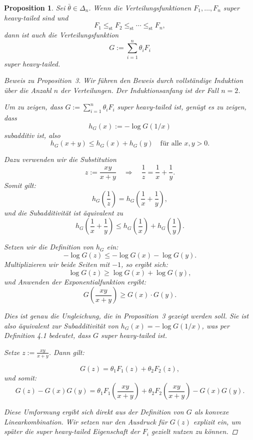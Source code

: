 \documentclass[
12pt,
fancyheadings, %
%
a4paper, 
%
]{tuhhreprt}
\newtheorem{proposition}[definition]{Proposition}
\begin{document}
    \begin{proposition}
Sei \( \bar{\theta} \in \Delta_n \). Wenn die Verteilungsfunktionen \( F_1, \dots, F_n \) super heavy-tailed sind und
\[
F_1 \leq_{\mathrm{st}} F_2 \leq_{\mathrm{st}} \cdots \leq_{\mathrm{st}} F_n,
\]
dann ist auch die Verteilungsfunktion
\[
G := \sum_{i=1}^n \theta_i F_i
\]
super heavy-tailed.  \cite[Proposition 3.]{ChenShneer2024}

\begin{proof}[Beweis zu Proposition~3]
Wir führen den Beweis durch vollständige Induktion über die Anzahl \( n \) der Verteilungen. Der Induktionsanfang ist der Fall \( n = 2 \).

Um zu zeigen, dass \( G := \sum_{i=1}^n \theta_i F_i \) super heavy-tailed ist, genügt es zu zeigen, dass
\[
h_G(x) := -\log G(1/x)
\]
subadditiv ist, also
\[
h_G(x + y) \leq h_G(x) + h_G(y) \quad \text{für alle } x, y > 0.
\]


\medskip

Dazu verwenden wir die Substitution
\[
z := \frac{xy}{x + y} \quad \Rightarrow \quad \frac{1}{z} = \frac{1}{x} + \frac{1}{y}.
\]
Somit gilt:
\[
h_G\left( \frac{1}{z} \right) = h_G\left( \frac{1}{x} + \frac{1}{y} \right),
\]
und die Subadditivität ist äquivalent zu
\[
h_G\left( \frac{1}{x} + \frac{1}{y} \right) \leq h_G\left( \frac{1}{x} \right) + h_G\left( \frac{1}{y} \right).
\]

Setzen wir die Definition von \( h_G \) ein:
\[
- \log G(z) \leq - \log G(x) - \log G(y).
\]
Multiplizieren wir beide Seiten mit \( -1 \), so ergibt sich:
\[
\log G(z) \geq \log G(x) + \log G(y),
\]
und Anwenden der Exponentialfunktion ergibt:
\[
G\left( \frac{xy}{x + y} \right) \geq G(x) \cdot G(y).
\tag{4}
\]

\medskip

Dies ist genau die Ungleichung, die in Proposition~3 gezeigt werden soll. Sie ist also äquivalent zur Subadditivität von \( h_G(x) = -\log G(1/x) \), was per Definition 4.1 bedeutet, dass \( G \) super heavy-tailed ist.

Setze \( z := \frac{xy}{x + y} \). Dann gilt:

\[
G(z) = \theta_1 F_1(z) + \theta_2 F_2(z),
\]
und somit:
\[
G(z) - G(x) G(y)
= \theta_1 F_1\left( \frac{xy}{x + y} \right)
+ \theta_2 F_2\left( \frac{xy}{x + y} \right)
- G(x) G(y).
\]

\textit{Diese Umformung ergibt sich direkt aus der Definition von \( G \) als konvexe Linearkombination. Wir setzen nur den Ausdruck für \( G(z) \) explizit ein, um später die super heavy-tailed Eigenschaft der \( F_i \) gezielt nutzen zu können.}


\end{proof}
\end{proposition}
\end{document}
